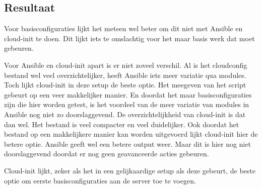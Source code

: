 \subsection{Resultaat}
Voor basisconfiguraties lijkt het meteen wel beter om dit niet met Ansible en cloud-init te doen. Dit lijkt iets te omslachtig voor het maar basis werk dat moet gebeuren. 

Voor Ansible en cloud-init apart is er niet zoveel verschil. Al is het cloudconfig bestand wel veel overzichtelijker, heeft Ansible iets meer variatie qua modules. Toch lijkt cloud-init in deze setup de beste optie. Het meegeven van het script gebeurt op een veer makkelijker manier. En doordat het maar basisconfiguraties zijn die hier worden getest, is het voordeel van de meer variatie van modules in Ansible nog niet zo doorslaggevend. De overzichtelijkheid van cloud-init is dat dan wel. Het bestand is veel compacter en veel duidelijker. Ook doordat het bestand op een makkelijkere manier kan worden uitgevoerd lijkt cloud-init hier de betere optie. Ansible geeft wel een betere output weer. Maar dit is hier nog niet doorslaggevend doordat er nog geen geavanceerde acties gebeuren.

Cloud-init lijkt, zeker als het in een gelijkaardige setup als deze gebeurt, de beste optie om eerste basisconfiguraties aan de server toe te voegen.
